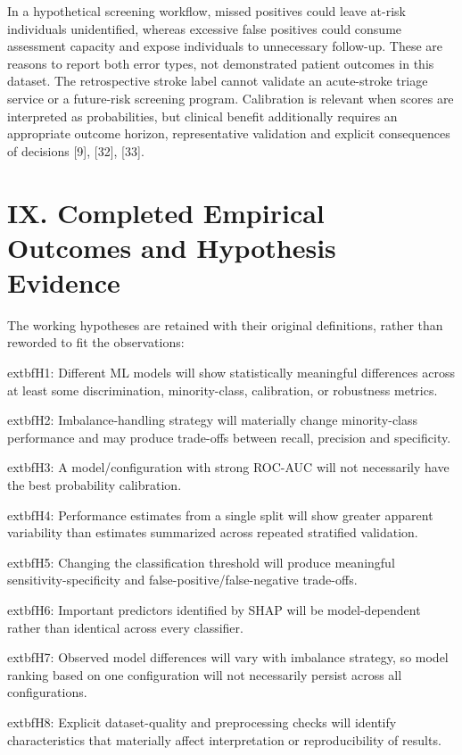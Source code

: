 \documentclass[10pt,twocolumn,letterpaper]{article}
\begin{document}
In a hypothetical screening workflow, missed positives could leave at-risk individuals unidentified, whereas excessive false positives could consume assessment capacity and expose individuals to unnecessary follow-up. These are reasons to report both error types, not demonstrated patient outcomes in this dataset. The retrospective stroke label cannot validate an acute-stroke triage service or a future-risk screening program. Calibration is relevant when scores are interpreted as probabilities, but clinical benefit additionally requires an appropriate outcome horizon, representative validation and explicit consequences of decisions [9], [32], [33].


\section*{IX. Completed Empirical Outcomes and Hypothesis Evidence}
The working hypotheses are retained with their original definitions, rather than reworded to fit the observations:


	extbf{H1:} Different ML models will show statistically meaningful differences across at least some discrimination, minority-class, calibration, or robustness metrics.


	extbf{H2:} Imbalance-handling strategy will materially change minority-class performance and may produce trade-offs between recall, precision and specificity.


	extbf{H3:} A model/configuration with strong ROC-AUC will not necessarily have the best probability calibration.


	extbf{H4:} Performance estimates from a single split will show greater apparent variability than estimates summarized across repeated stratified validation.


	extbf{H5:} Changing the classification threshold will produce meaningful sensitivity-specificity and false-positive/false-negative trade-offs.


	extbf{H6:} Important predictors identified by SHAP will be model-dependent rather than identical across every classifier.


	extbf{H7:} Observed model differences will vary with imbalance strategy, so model ranking based on one configuration will not necessarily persist across all configurations.


	extbf{H8:} Explicit dataset-quality and preprocessing checks will identify characteristics that materially affect interpretation or reproducibility of results.
\end{document}
